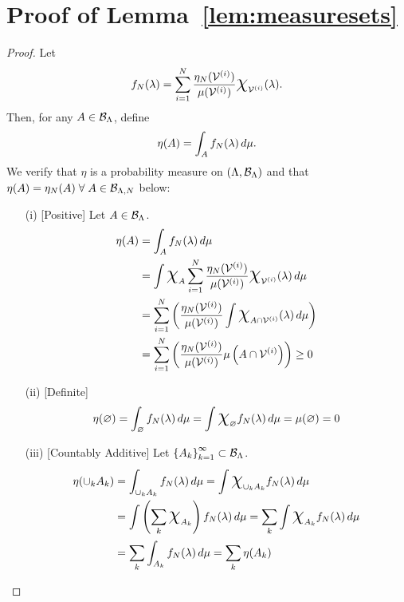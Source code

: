 \chapter{Proof of Lemma~\ref{lem:measuresets}}\label{app:measuresets}
\begin{proof}
Let
\begin{equation}
f_\nsamps (\param) = \sum_{\iparam=1}^{\nsamps} \frac{\eta_\nsamps (\VV^{(\iparam)}) }{\mu (\VV^{(\iparam)})} \Chi_{\VV^{(\iparam)}} (\param).
\end{equation}
Then, for any $A\in\mathcal{B}_{\Lambda}$, define
\begin{equation}
\eta (A) = \int_A f_N (\lambda) \, d\mu.
\end{equation}
We verify that $\eta$ is a probability measure on $({\Lambda}, \mathcal{B}_{\Lambda})$ and that $\eta(A) = \eta_N(A) \; \forall \; A\in\mathcal{B}_{{\Lambda}, N}$ below:
\begin{itemize}
\item[(i)][Positive]
Let $A\in \mathcal{B}_{{\Lambda}}$.
\begin{equation*}
\begin{split}
\eta (A) &= \int_A f_\nsamps (\param) \, d\mu \\
&=  \int \Chi_A \sum_{\iparam=1}^{\nsamps} \frac{\eta_\nsamps (\VV^{(\iparam)}) }{\mu (\VV^{(\iparam)})} \Chi_{\VV^{(\iparam)}} (\param) \, d\mu \\
&= \sum_{\iparam=1}^{\nsamps} \left ( \frac{\eta_\nsamps (\VV^{(\iparam)}) }{\mu (\VV^{(\iparam)})} \int \Chi_{A\cap\VV^{(\iparam)}} (\param) \, d\mu \right ) \\
&= \sum_{\iparam=1}^{\nsamps} \left ( \frac{\eta_\nsamps (\VV^{(\iparam)}) }{\mu (\VV^{(\iparam)})} \mu\left (A\cap\VV^{(\iparam)}\right ) \right ) \geq 0
\end{split}
\end{equation*}

\item[(ii)][Definite]
\begin{equation*}
\eta (\nullset) = \int_\nullset f_\nsamps (\param) \, d\mu =\int \Chi_\nullset f_\nsamps (\param) \, d\mu = \mu(\nullset) = 0
\end{equation*}

\item[(iii)][Countably Additive]
Let $\left\{A_k\right\}_{k=1}^{\infty} \subset \mathcal{B}_{{\Lambda}}$.
\begin{equation*}
\begin{split}
\eta (\cup_k A_k) &= \int_{\cup_k A_k} f_\nsamps (\param) \, d\mu
= \int \Chi_{\cup_k A_k} f_\nsamps (\param) \, d\mu \\
&= \int \left( \sum_k \Chi_{A_k} \right ) f_\nsamps (\param) \, d\mu
=   \sum_k \int \Chi_{A_k} f_\nsamps (\param) \, d\mu \\
&=   \sum_k \int_{A_k} f_\nsamps (\param) \, d\mu = \sum_k \eta(A_k)
\end{split}
\end{equation*}



\end{itemize}
\end{proof}
